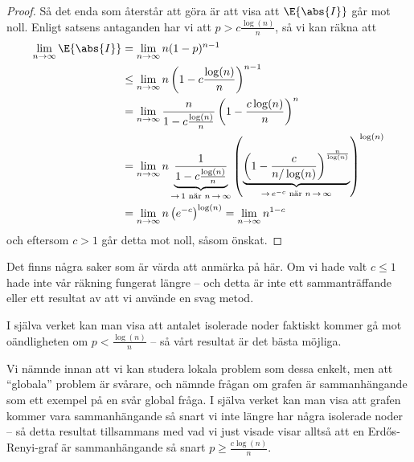 \documentclass[nobib]{tufte-handout}
\begin{document}
\begin{proposition}
\begin{proof}
        Så det enda som återstår att göra är att visa att $\E{\abs{I}}$ går mot noll. Enligt satsens antaganden har vi att $p > c\frac{\log(n)}{n}$, så vi kan räkna att
        \begin{align*}
            \lim_{n\to\infty} \E{\abs{I}} &= \lim_{n\to\infty} n(1-p)^{n-1}\\
            &\leq \lim_{n\to\infty} n\left(1 - c\frac{\log(n)}{n}\right)^{n-1}\\
            &= \lim_{n\to\infty} \frac{n}{1 - c\frac{\log(n)}{n}}\left(1 - \frac{c\log(n)}{n}\right)^{n}\\
            &= \lim_{n\to\infty} n\underbrace{\frac{1}{1 - c\frac{\log(n)}{n}}}_{\to\, 1\text{ när }n\,\to\,\infty}\left(\underbrace{\left(1 - \frac{c}{n/\log(n)}\right)^{\frac{n}{\log(n)}}}_{\to\, e^{-c}\text{ när }n\,\to\, \infty}\right)^{\log(n)}\\
            &= \lim_{n \to \infty} n \left(e^{-c}\right)^{\log(n)} = \lim_{n \to \infty} n^{1-c}
        \end{align*}
        och eftersom $c > 1$ går detta mot noll, såsom önskat.
    \end{proof}
\end{proposition}

Det finns några saker som är värda att anmärka på här. Om vi hade valt $c \leq 1$ hade inte vår räkning fungerat längre -- och detta är inte ett sammanträffande eller ett resultat av att vi använde en svag metod.

I själva verket kan man visa att antalet isolerade noder faktiskt kommer gå mot oändligheten om $p < \frac{\log(n)}{n}$ -- så vårt resultat är det bästa möjliga.

Vi nämnde innan att vi kan studera lokala problem som dessa enkelt, men att ``globala'' problem är svårare, och nämnde frågan om grafen är sammanhängande som ett exempel på en svår global fråga. I själva verket kan man visa att grafen kommer vara sammanhängande så snart vi inte längre har några isolerade noder -- så detta resultat tillsammans med vad vi just visade visar alltså att en Erd\H{o}s-Renyi-graf är sammanhängande så snart $p \geq \frac{c\log(n)}{n}$.
\end{document}
